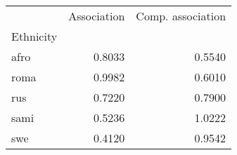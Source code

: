 \begin{tabular}{lrr}
\toprule
{} &  Association &  Comp. association \\
Ethnicity &              &                    \\
\midrule
afro      &       0.8033 &             0.5540 \\
roma      &       0.9982 &             0.6010 \\
rus       &       0.7220 &             0.7900 \\
sami      &       0.5236 &             1.0222 \\
swe       &       0.4120 &             0.9542 \\
\bottomrule
\end{tabular}
